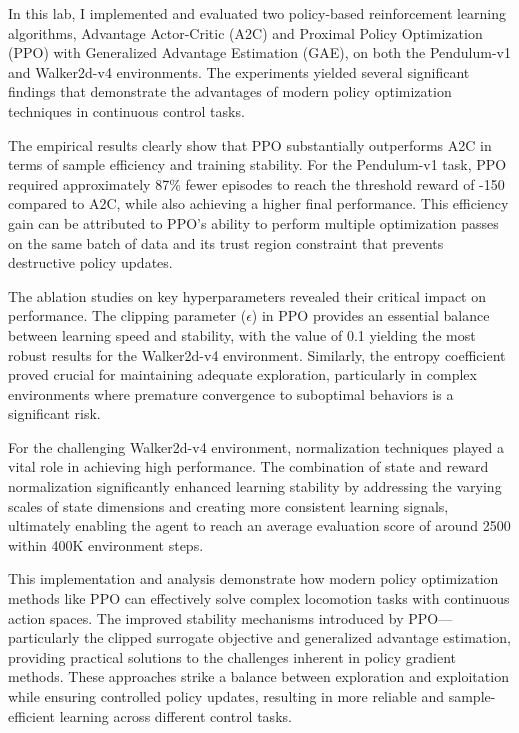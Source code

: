 \documentclass[a4paper,twocolumn]{article}
\begin{document}
In this lab, I implemented and evaluated two policy-based reinforcement learning algorithms, Advantage Actor-Critic (A2C) and Proximal Policy Optimization (PPO) with Generalized Advantage Estimation (GAE), on both the Pendulum-v1 and Walker2d-v4 environments. The experiments yielded several significant findings that demonstrate the advantages of modern policy optimization techniques in continuous control tasks.

The empirical results clearly show that PPO substantially outperforms A2C in terms of sample efficiency and training stability. For the Pendulum-v1 task, PPO required approximately 87\% fewer episodes to reach the threshold reward of -150 compared to A2C, while also achieving a higher final performance. This efficiency gain can be attributed to PPO's ability to perform multiple optimization passes on the same batch of data and its trust region constraint that prevents destructive policy updates.

The ablation studies on key hyperparameters revealed their critical impact on performance. The clipping parameter ($\epsilon$) in PPO provides an essential balance between learning speed and stability, with the value of 0.1 yielding the most robust results for the Walker2d-v4 environment. Similarly, the entropy coefficient proved crucial for maintaining adequate exploration, particularly in complex environments where premature convergence to suboptimal behaviors is a significant risk.

For the challenging Walker2d-v4 environment, normalization techniques played a vital role in achieving high performance. The combination of state and reward normalization significantly enhanced learning stability by addressing the varying scales of state dimensions and creating more consistent learning signals, ultimately enabling the agent to reach an average evaluation score of around 2500 within 400K environment steps.

This implementation and analysis demonstrate how modern policy optimization methods like PPO can effectively solve complex locomotion tasks with continuous action spaces. The improved stability mechanisms introduced by PPO—particularly the clipped surrogate objective and generalized advantage estimation, providing practical solutions to the challenges inherent in policy gradient methods. These approaches strike a balance between exploration and exploitation while ensuring controlled policy updates, resulting in more reliable and sample-efficient learning across different control tasks.



\printbibliography
\end{document}
